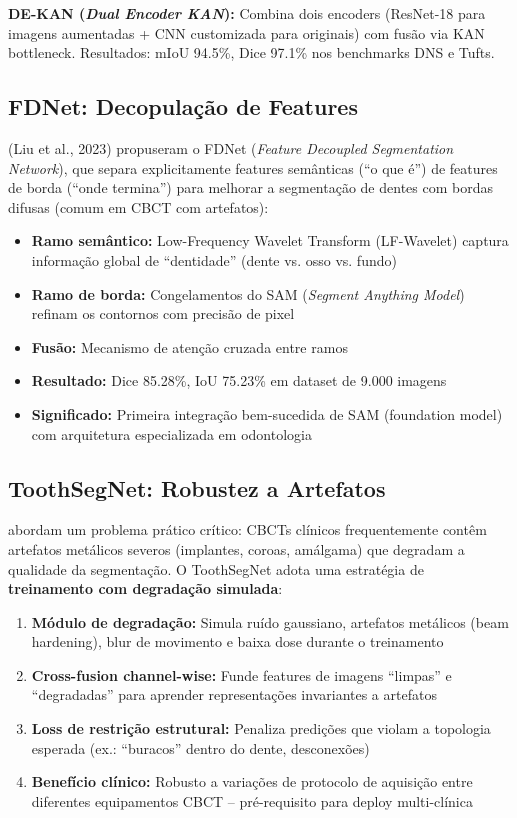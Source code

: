 \textbf{DE-KAN (\textit{Dual Encoder KAN}):} Combina dois encoders (ResNet-18
para imagens aumentadas + CNN customizada para originais) com fusão via KAN
bottleneck. Resultados: mIoU 94.5\%, Dice 97.1\% nos benchmarks DNS e Tufts.

\subsection{FDNet: Decopulação de Features}

 (Liu et al., 2023) propuseram o FDNet (\textit{Feature
Decoupled Segmentation Network}), que separa explicitamente features semânticas
(``o que é'') de features de borda (``onde termina'') para melhorar a
segmentação de dentes com bordas difusas (comum em CBCT com artefatos):

\begin{itemize}
  \item \textbf{Ramo semântico:} Low-Frequency Wavelet Transform (LF-Wavelet)
        captura informação global de ``dentidade'' (dente vs. osso vs. fundo)
  \item \textbf{Ramo de borda:} Congelamentos do SAM (\textit{Segment Anything
        Model}) refinam os contornos com precisão de pixel
  \item \textbf{Fusão:} Mecanismo de atenção cruzada entre ramos
  \item \textbf{Resultado:} Dice 85.28\%, IoU 75.23\% em dataset de 9.000 imagens
  \item \textbf{Significado:} Primeira integração bem-sucedida de SAM (foundation
        model) com arquitetura especializada em odontologia
\end{itemize}

\subsection{ToothSegNet: Robustez a Artefatos}

 abordam um problema prático crítico: CBCTs clínicos
frequentemente contêm artefatos metálicos severos (implantes, coroas, amálgama)
que degradam a qualidade da segmentação. O ToothSegNet adota uma estratégia de
\textbf{treinamento com degradação simulada}:

\begin{enumerate}
  \item \textbf{Módulo de degradação:} Simula ruído gaussiano, artefatos
        metálicos (beam hardening), blur de movimento e baixa dose durante
        o treinamento
  \item \textbf{Cross-fusion channel-wise:} Funde features de imagens ``limpas''
        e ``degradadas'' para aprender representações invariantes a artefatos
  \item \textbf{Loss de restrição estrutural:} Penaliza predições que violam
        a topologia esperada (ex.: ``buracos'' dentro do dente, desconexões)
  \item \textbf{Benefício clínico:} Robusto a variações de protocolo de
        aquisição entre diferentes equipamentos CBCT -- pré-requisito para
        deploy multi-clínica
\end{enumerate}

